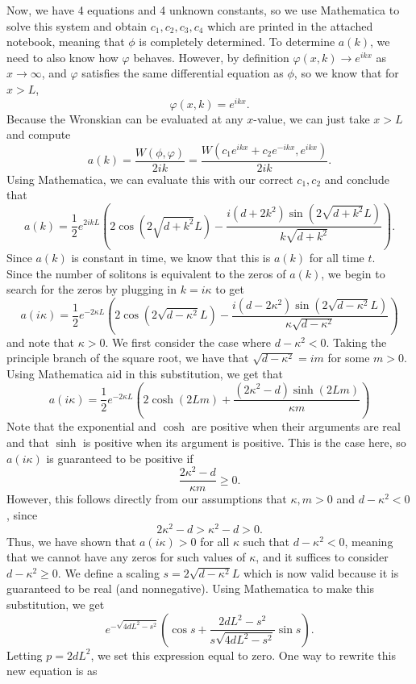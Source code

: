 \documentclass{article}
\begin{document}
Now, we have 4 equations and 4 unknown constants, so we use Mathematica to solve this system and obtain $c_1,c_2,c_3,c_4$ which are printed in the attached notebook, meaning that $\phi$ is completely determined. To determine $a(k)$, we need to also know how $\varphi$ behaves. However, by definition $\varphi(x,k)\to e^{ikx}$ as $x\to\infty$, and $\varphi$ satisfies the same differential equation as $\phi$, so we know that for $x>L$,
\[
\varphi(x,k)=e^{ikx}.
\]
Because the Wronskian can be evaluated at any $x$-value, we can just take $x>L$ and compute
\[
a(k)=\frac{W(\phi,\varphi)}{2ik}=\frac{W(c_1e^{ikx}+c_2e^{-ikx},e^{ikx})}{2ik}.
\]
Using Mathematica, we can evaluate this with our correct $c_1,c_2$ and conclude that
\[
a(k)=\frac{1}{2}e^{2ikL}\left(2\cos\left(2\sqrt{d+k^2}L\right)-\frac{i(d+2k^2)\sin\left(2\sqrt{d+k^2}L\right)}{k\sqrt{d+k^2}}\right).
\]
Since $a(k)$ is constant in time, we know that this is $a(k)$ for all time $t$.\\
Since the number of solitons is equivalent to the zeros of $a(k)$, we begin to search for the zeros by plugging in $k=i\kappa$ to get
\[
a(i\kappa)=\frac{1}{2}e^{-2\kappa L}\left(2\cos\left(2\sqrt{d-\kappa^2}L\right)-\frac{i(d-2\kappa^2)\sin\left(2\sqrt{d-\kappa^2}L\right)}{\kappa\sqrt{d-\kappa^2}}\right)
\]
and note that $\kappa>0$. We first consider the case where $d-\kappa^2<0$. Taking the principle branch of the square root, we have that $\sqrt{d-\kappa^2}=im$ for some $m>0$. Using Mathematica aid in this substitution, we get that
\[
a(i\kappa)=\frac{1}{2}e^{-2\kappa L}\left(2\cosh\left(2Lm\right)+\frac{(2\kappa^2-d)\sinh\left(2Lm\right)}{\kappa m}\right)
\]
Note that the exponential and $\cosh$ are positive when their arguments are real and that $\sinh$ is positive when its argument is positive. This is the case here, so $a(i\kappa)$ is guaranteed to be positive if 
\[
\frac{2\kappa^2-d}{\kappa m}\geq0.
\]
However, this follows directly from our assumptions that $\kappa,m>0$ and $d-\kappa^2<0$, since
\[
2\kappa^2-d>\kappa^2-d>0.
\]
Thus, we have shown that $a(i\kappa)>0$ for all $\kappa$ such that $d-\kappa^2<0$, meaning that we cannot have any zeros for such values of $\kappa$, and it suffices to consider $d-\kappa^2\geq0$. We define a scaling $s=2\sqrt{d-\kappa^2}L$ which is now valid because it is guaranteed to be real (and nonnegative). Using Mathematica to make this substitution, we get 
\[
e^{-\sqrt{4dL^2-s^2}}\left(\cos s+\frac{2dL^2-s^2}{s\sqrt{4dL^2-s^2}}\sin s\right).
\]
Letting $p=2dL^2$, we set this expression equal to zero. One way to rewrite this new equation is as
\end{document}
